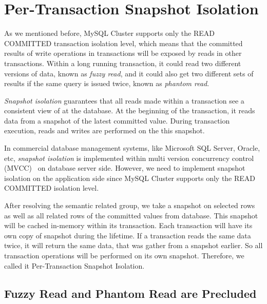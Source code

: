 \section{Per-Transaction Snapshot Isolation}

As we mentioned before, MySQL Cluster supports only the READ COMMITTED transaction isolation level, which means that the committed results of write operations in transactions will be exposed by reads in other transactions. Within a long running transaction, it could read two different versions of data, known as \textit{fuzzy read}, and it could also get two different sets of results if the same query is issued twice, known as \textit{phantom read}.

\noindent \textit{Snapshot isolation} guarantees that all reads made within a transaction see a consistent view of at the database. At the beginning of the transaction, it reads data from a snapshot of the latest committed value. During transaction execution, reads and writes are performed on the this snapshot.

\noindent In commercial database management systems, like Microsoft SQL Server, Oracle, etc, \textit{snapshot isolation} is implemented within multi version concurrency control (MVCC)~\cite{berenson1995critique} on database server side. However, we need to implement snapshot isolation on the application side since MySQL Cluster supports only the READ COMMITTED isolation level.

\noindent After resolving the semantic related group, we take a snapshot on selected rows as well as all related rows of the committed values from database. This snapshot will be cached in-memory within its transaction. Each transaction will have its own copy of snapshot during the lifetime. If a transaction reads the same data twice, it will return the same data, that was gather from a snapshot earlier. So all transaction operations will be performed on its own snapshot. Therefore, we called it Per-Transaction Snapshot Isolation.

\subsection{Fuzzy Read and Phantom Read are Precluded}

